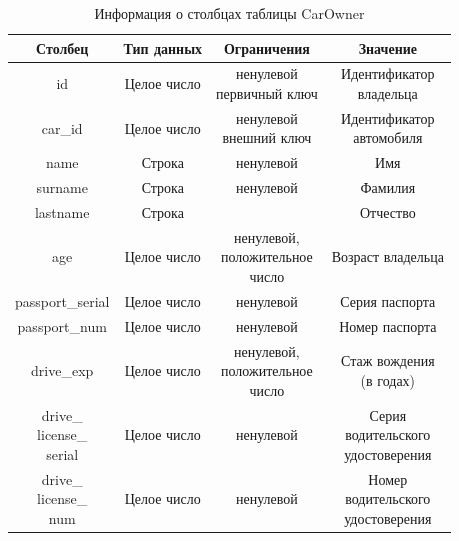 
\begin{table}[H]
    \begin{center}
        \caption{Информация о столбцах таблицы CarOwner}
        \begin{tabular}{|c|c|c|c|}
            \hline
            Столбец & Тип данных & Ограничения & Значение \\
            \hline
            id & Целое число & \makecell{ненулевой \\ первичный ключ} & \makecell{Идентификатор \\ владельца} \\
            \hline
            car\_id & Целое число & \makecell{ненулевой \\ внешний ключ} & \makecell{Идентификатор \\ автомобиля} \\
            \hline
            name & Строка & ненулевой & Имя \\
            \hline
            surname & Строка & ненулевой & Фамилия \\
            \hline
            lastname & Строка &  & Отчество \\
            \hline
            age & Целое число & \makecell{ненулевой, \\ положительное \\ число} & Возраст владельца \\
            \hline
            passport\_serial & Целое число & ненулевой & Серия паспорта \\
            \hline
            passport\_num & Целое число & ненулевой & Номер паспорта \\
            \hline
            drive\_exp & Целое число & \makecell{ненулевой, \\ положительное \\ число} & \makecell{Стаж вождения \\ (в годах)} \\
            \hline
            \makecell{ drive\_ \\ license\_ \\ serial } & Целое число & ненулевой & \makecell{Серия \\ водительского \\ удостоверения} \\
            \hline
            \makecell{drive\_ \\ license\_ \\ num} & Целое число & ненулевой & \makecell{Номер \\ водительского \\ удостоверения} \\
            \hline
        \end{tabular}
        \label{table:db:car_owners}
    \end{center}
\end{table}

